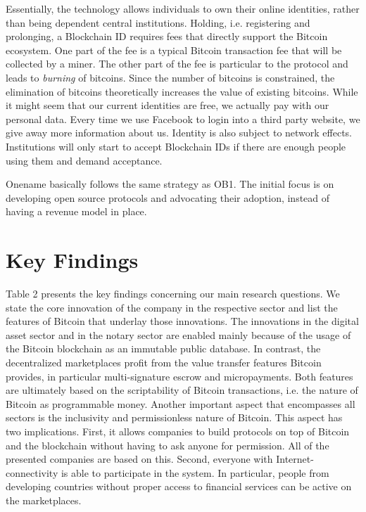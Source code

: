 Essentially, the technology allows individuals to own their online identities, 
rather than being dependent central institutions. Holding, i.e. registering and 
prolonging, a Blockchain ID requires fees that directly support the Bitcoin ecosystem. 
One part of the fee is a typical Bitcoin transaction fee that will be collected 
by a miner. The other part of the fee is particular to the protocol and leads to 
\emph{burning} of bitcoins. Since the number of bitcoins is constrained, the elimination 
of bitcoins theoretically increases the value of existing bitcoins. While it might 
seem that our current identities are free, we actually pay with our personal data. 
Every time we use Facebook to login into a third party website, we give away more 
information about us. Identity is also subject to network effects. Institutions 
will only start to accept Blockchain IDs if there are enough people using them 
and demand acceptance. 

Onename basically follows the same strategy as OB1. The initial focus is on developing 
open source protocols and advocating their adoption, instead of having a revenue 
model in place.

\section{Key Findings}
\label{sec:eco:findings}

Table 2 presents the key findings concerning our main research questions. We state 
the core innovation of the company in the respective sector and list the features 
of Bitcoin that underlay those innovations. The innovations in the digital asset 
sector and in the notary sector are enabled mainly because of the usage of the 
Bitcoin blockchain as an immutable public database. In contrast, the decentralized 
marketplaces profit from the value transfer features Bitcoin provides, in particular 
multi-signature escrow and micropayments. Both features are ultimately based on 
the scriptability of Bitcoin transactions, i.e. the nature of Bitcoin as programmable 
money. Another important aspect that encompasses all sectors is the inclusivity 
and permissionless nature of Bitcoin. This aspect has two implications. First, 
it allows companies to build protocols on top of Bitcoin and the blockchain without 
having to ask anyone for permission. All of the presented companies are based on 
this. Second, everyone with Internet-connectivity is able to participate in the 
system. In particular, people from developing countries without proper access to 
financial services can be active on the marketplaces. 

